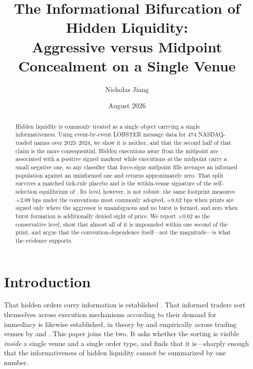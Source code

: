 \documentclass[11pt]{article}
\title{The Informational Bifurcation of Hidden Liquidity:\\
Aggressive versus Midpoint Concealment on a Single Venue}
\author{Nicholas Jiang}
\date{August 2026}
\begin{document}
\maketitle

\begin{abstract}
Hidden liquidity is commonly treated as a single object carrying a single informativeness.
Using event-by-event LOBSTER message data for 474 NASDAQ-traded names over 2023--2024, we show
it is neither, and that the second half of that claim is the more consequential. Hidden
executions away from the midpoint are associated with a positive signed markout while
executions \emph{at} the midpoint carry a small negative one, so any classifier that
force-signs midpoint fills averages an informed population against an uninformed one and
returns approximately zero. That split survives a matched tick-rule placebo and is the
within-venue signature of the self-selection equilibrium of \citet{zhu2014}. Its \emph{level},
however, is not robust: the same footprint measures $+2.09$ bps under the conventions most
commonly adopted, $+0.62$ bps when prints are signed only where the aggressor is unambiguous
and no burst is formed, and zero when burst formation is additionally denied sight of price.
We report $+0.62$ as the conservative level, show that almost all of it is impounded within
one second of the print, and argue that the convention-dependence itself---not the
magnitude---is what the evidence supports.
\end{abstract}

\section{Introduction}
\label{sec:intro}

That hidden orders carry information is established \citep{bessembinder2009, hautsch2012}.
That informed traders sort themselves across execution mechanisms according to their demand
for immediacy is likewise established, in theory by \citet{zhu2014} and empirically across
trading venues by \citet{comertonforde2015} and \citet{buti2017}. This paper joins the two.
It asks whether the sorting is visible \emph{inside} a single venue and a single order
type, and finds that it is---sharply enough that the informativeness of hidden liquidity
cannot be summarized by one number.
\end{document}
